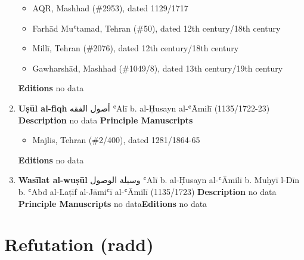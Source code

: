\documentclass{article}
\begin{document}
\begin{enumerate}
\begin{itemize}
    \item AQR, Mashhad (\#2953), dated 1129/1717
    
    \item Farhād Muʿtamad, Tehran (\#50), dated 12th century/18th century
    
    \item Millī, Tehran (\#2076), dated 12th century/18th century
    
    \item Gawharshād, Mashhad (\#1049/8), dated 13th century/19th century
    \end{itemize}
\textbf{Editions}
\newline
no data\newline
      \item \textbf{Uṣūl al-fiqh}
        \newline
        \textarabic{أصول الفقه}
        \newline
        ʿAlī b. al-Ḥusayn al-ʿĀmilī
        \newline
        (1135/1722-23)
        \newline
        \newline
        \textbf{Description}
        \newline	
        no data
        \newline
        \newline
    \textbf{Principle Manuscripts}
\begin{itemize}
    \item Majlis, Tehran (\#2/400), dated 1281/1864-65
    \end{itemize}
\textbf{Editions}
\newline
no data\newline
      \item \textbf{Wasīlat al-wuṣūl}
        \newline
        \textarabic{وسيلة الوصول}
        \newline
        ʿAlī b. al-Ḥusayn al-ʿĀmilī b. Muḥyī l-Dīn b. ʿAbd al-Laṭīf al-Jāmiʿī al-ʿĀmilī
        \newline
        (1135/1723)
        \newline
        \newline
        \textbf{Description}
        \newline	
        no data
        \newline
        \newline
    \textbf{Principle Manuscripts}
\newline
no data\newline\textbf{Editions}
\newline
no data\newline\end{enumerate}\section{Refutation (radd)}
\end{document}
